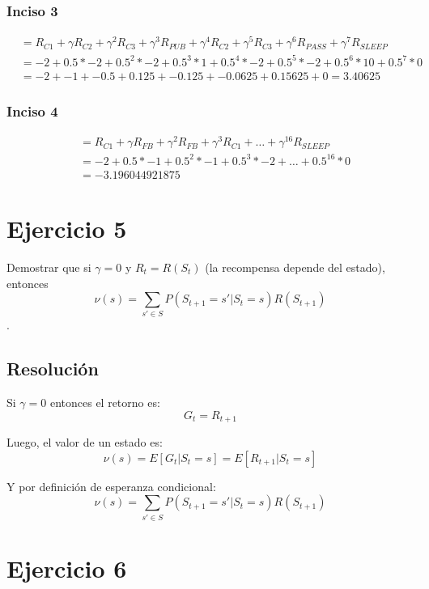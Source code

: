 \documentclass[12pt,a4paper]{article}
\begin{document}
\subsubsection{Inciso 3}
\begin{align}
\tag{1} &= R_{C1} + \gamma R_{C2} + \gamma^2 R_{C3} + \gamma^3 R_{PUB} + \gamma^4 R_{C2} + \gamma^5 R_{C3} + \gamma^6 R_{PASS} + \gamma^7 R_{SLEEP} \\
\tag{2} &= -2     + 0.5 * -2      + 0.5^2 * -2      + 0.5^3 * 1      + 0.5^4 * -2      + 0.5^5 * -2      + 0.5^6 * 10         + 0.5^7 * 0 \\
\tag{3} &= -2     + -1            + -0.5            + 0.125            + -0.125           + -0.0625          + 0.15625            + 0  = 3.40625
\end{align}

\subsubsection{Inciso 4}
\begin{align}
\tag{1} &= R_{C1} + \gamma R_{FB} + \gamma^2 R_{FB} + \gamma^3 R_{C1} + \dots + \gamma^{16} R_{SLEEP} \\
\tag{2} &= -2     + 0.5 * -1      + 0.5^2 * -1      + 0.5^3 * -2      + \dots + 0.5^{16} * 0 \\
\tag{3} &= -3.196044921875
\end{align}

\section{Ejercicio 5}

Demostrar que si $\gamma = 0$ y $R_t = R(S_t)$ (la recompensa depende del estado), entonces
$$ \nu(s) = \sum_{s' \in S} P(S_{t+1} = s'| S_t = s) R(S_{t+1})$$.

\subsection{Resolución}

Si $\gamma = 0$ entonces el retorno es:
$$ G_t = R_{t+1} $$

Luego, el valor de un estado es:
$$ \nu(s) = E[G_t | S_t = s] = E[R_{t+1} | S_t = s] $$

Y por definición de esperanza condicional:
$$ \nu(s) = \sum_{s' \in S} P(S_{t+1} = s'| S_t = s) R(S_{t+1})$$

\section{Ejercicio 6}
\end{document}
